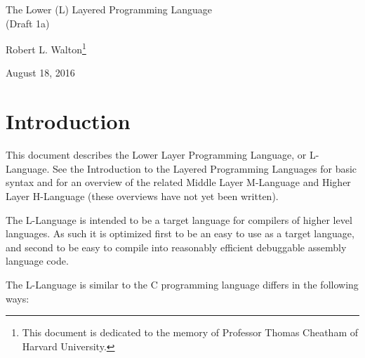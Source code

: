 \documentclass[12pt]{article}
\makeatletter
\renewcommand\tableofcontents{%
    \begin{list}{}%
	     {\setlength{\itemsep}{0in}%
	      \setlength{\topsep}{0in}%
	      \setlength{\parsep}{1ex}%
	      \setlength{\labelwidth}{0in}%
	      \setlength{\baselineskip}{1.5ex}%
	      \setlength{\leftmargin}{1.0in}%
	      \setlength{\rightmargin}{1.0in}}%
    \item\@starttoc{toc}%
    \end{list}}
\makeatother
\begin{document}
        
\begin{center}

{\Large
The Lower (L) Layered Programming Language \\[0.5ex]
(Draft 1a)}

\medskip

Robert L. Walton\footnote{This document is dedicated to the memory
of Professor Thomas Cheatham of Harvard University.}

August 18, 2016
 
\end{center}

{\small \tableofcontents}

\newpage

\section{Introduction}

This document describes the Lower Layer Programming Language, or
L-Language.  See the Introduction to the Layered
Programming Languages for basic syntax and for an overview of the related
Middle Layer M-Language and Higher Layer H-Language (these overviews
have not yet been written).

The L-Language is intended to be a target language for compilers of
higher level languages.  As such it is optimized first to be an easy to 
use as a target language, and second to be easy to
compile into reasonably efficient debuggable assembly language code.

The L-Language is similar to the C programming language
differs in the following ways:
\end{document}
